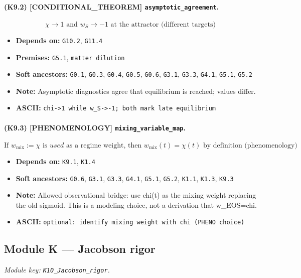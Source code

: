 \documentclass[11pt,a4paper]{article}
\theoremstyle{remark}\newtheorem*{caution}{Caution}
\newcommand{\tagbox}[1]{\textsc{[#1]}}
\begin{document}
\paragraph{(K9.2) \tagbox{CONDITIONAL\_THEOREM} \texttt{asymptotic\_agreement}.}
\begin{equation}
\chi\to 1\text{ and }w_S\to -1\text{ at the attractor (different targets)}
\tag{K9.2}
\end{equation}
\begin{itemize}\setlength{\itemsep}{0.12em}
\item \textbf{Depends on:} \texttt{G10.2}, \texttt{G11.4}
\item \textbf{Premises:} \texttt{G5.1}, \texttt{matter dilution}
\item \textbf{Soft ancestors:} \texttt{G0.1}, \texttt{G0.3}, \texttt{G0.4}, \texttt{G0.5}, \texttt{G0.6}, \texttt{G3.1}, \texttt{G3.3}, \texttt{G4.1}, \texttt{G5.1}, \texttt{G5.2}
\item \textbf{Note:} Asymptotic diagnostics agree that equilibrium is reached; values differ.
\item \textbf{ASCII:} \texttt{chi->1 while w\_S->-1; both mark late equilibrium}
\end{itemize}
\paragraph{(K9.3) \tagbox{PHENOMENOLOGY} \texttt{mixing\_variable\_map}.}
\begin{equation}
\text{If }w_{\mathrm{mix}}:=\chi\text{ is }used\text{ as a regime weight,}\text{ then }w_{\mathrm{mix}}(t)=\chi(t)\text{ by definition (phenomenology)}
\tag{K9.3}
\end{equation}
\begin{itemize}\setlength{\itemsep}{0.12em}
\item \textbf{Depends on:} \texttt{K9.1}, \texttt{K1.4}
\item \textbf{Soft ancestors:} \texttt{G0.6}, \texttt{G3.1}, \texttt{G3.3}, \texttt{G4.1}, \texttt{G5.1}, \texttt{G5.2}, \texttt{K1.1}, \texttt{K1.3}, \texttt{K9.3}
\item \textbf{Note:} Allowed observational bridge: use chi(t) as the mixing weight replacing the old sigmoid. This is a modeling choice, not a derivation that w\_EOS=chi.
\item \textbf{ASCII:} \texttt{optional: identify mixing weight with chi (PHENO choice)}
\end{itemize}
\subsection{Module K --- Jacobson rigor}
\textit{Module key: \texttt{K10\_Jacobson\_rigor}.}
\end{document}
